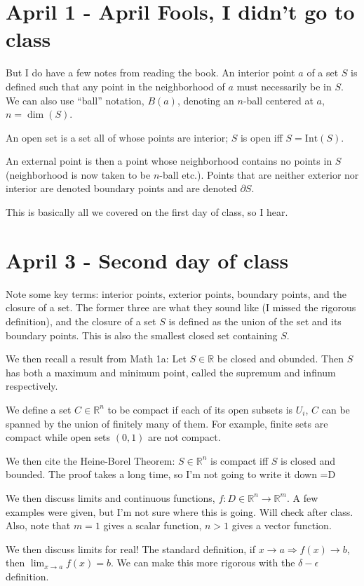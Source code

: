 \documentclass[12pt]{article}
\begin{document}
\doublespace
\pagestyle{fancy}
\setlength{\headheight}{15pt}

\section{April 1 - April Fools, I didn't go to class}

But I do have a few notes from reading the book. An interior point $a$ of a set $S$ is defined such that any point in the neighborhood of $a$ must necessarily be in $S$. We can also use ``ball'' notation, $B(a)$, denoting an $n$-ball centered at $a$, $n=\dim(S)$. 

An open set is a set all of whose points are interior; $S$ is open iff $S = \mathrm{Int}(S)$. 

An external point is then a point whose neighborhood contains no points in $S$ (neighborhood is now taken to be $n$-ball etc.). Points that are neither exterior nor interior are denoted boundary points and are denoted $\partial S$.

This is basically all we covered on the first day of class, so I hear.

\section{April 3 - Second day of class}

Note some key terms: interior points, exterior points, boundary points, and the closure of a set. The former three are what they sound like (I missed the rigorous definition), and the closure of a set $S$ is defined as the union of the set and its boundary points. This is also the smallest closed set containing $S$.

We then recall a result from Math 1a: Let $S \in \mathbb{R}$ be closed and obunded. Then $S$ has both a maximum and minimum point, called the supremum and infinum respectively.

We define a set $C \in \mathbb{R}^n$ to be compact if each of its open subsets is $U_i$, $C$ can be spanned by the union of finitely many of them. For example, finite sets are compact while open sets $(0,1)$ are not compact. 

We then cite the Heine-Borel Theorem: $S\in \mathbb{R}^n$ is compact iff $S$ is closed and bounded. The proof takes a long time, so I'm not going to write it down =D

We then discuss limits and continuous functions, $f:D\in \mathbb{R}^n \to \mathbb{R}^m$. A few examples were given, but I'm not sure where this is going. Will check after class. Also, note that $m = 1$ gives a scalar function, $n > 1$ gives a vector function.

We then discuss limits for real! The standard definition, if $x \to a \Rightarrow f(x) \to b$, then $\lim_{x \to a}f(x) = b$. We can make this more rigorous with the $\delta-\epsilon$ definition. 
\end{document}

